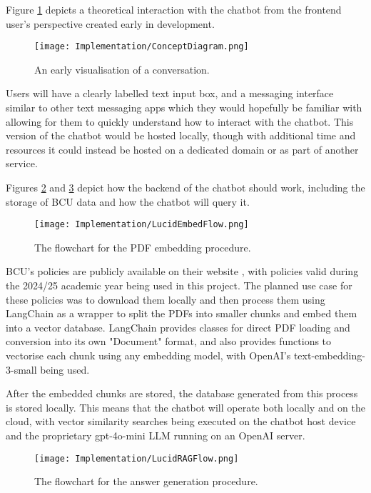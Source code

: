 Figure \ref{fig:ConceptDiagram} depicts a theoretical interaction with the chatbot from the frontend user's perspective created 
early in development.

\begin{figure}[H]
    \centering
    \texttt{[image: Implementation/ConceptDiagram.png]}
    \caption{An early visualisation of a conversation.\label{fig:ConceptDiagram}}
\end{figure}

\noindent Users will have a clearly labelled text input box, and a messaging interface similar to other text messaging apps 
which they would hopefully be familiar with allowing for them to quickly understand how to interact with the chatbot.
This version of the chatbot would be hosted locally, though with additional time and resources it could instead be hosted on a 
dedicated domain or as part of another service.

\para Figures \ref{fig:EmbedFlowchart} and \ref{fig:RAGFlowchart} depict how the backend of the chatbot should work, including the 
storage of BCU data and how the chatbot will query it.

\begin{figure}[H]
    \centering
    \texttt{[image: Implementation/LucidEmbedFlow.png]}
    \caption{The flowchart for the PDF embedding procedure.\label{fig:EmbedFlowchart}}
\end{figure}

\noindent BCU's policies are publicly available on their website \autocite{bcuPoliciesProcedures}, with policies valid during the 2024/25 academic
year being used in this project. The planned use case for these policies was to download them locally and then process them using LangChain as a 
wrapper to split the PDFs into smaller chunks and embed them into a vector database. LangChain provides classes for direct PDF loading and 
conversion into its own "Document" format, and also provides functions to vectorise each chunk using any embedding model, with OpenAI's 
text-embedding-3-small being used. 

\para After the embedded chunks are stored, the database generated from this process is stored locally. This means that the chatbot will operate 
both locally and on the cloud, with vector similarity searches being executed on the chatbot host device and the proprietary gpt-4o-mini LLM running 
on an OpenAI server.

\begin{figure}[H]
    \centering
    \texttt{[image: Implementation/LucidRAGFlow.png]}
    \caption{The flowchart for the answer generation procedure.\label{fig:RAGFlowchart}}
\end{figure}


